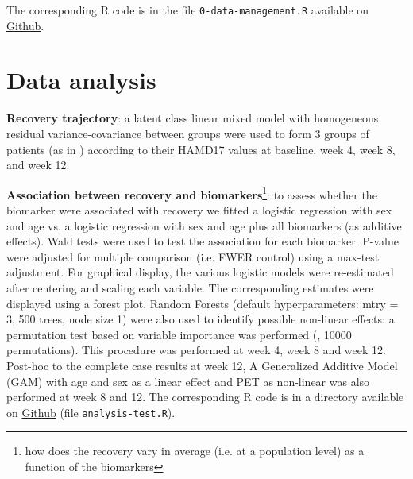 \documentclass[12pt]{article}
\begin{document}
\bigskip

The corresponding R code is in the file \texttt{0-data-management.R} available on \href{https://github.com/bozenne/article-predictionNP1BD3/blob/master/code-data-analysis/0-data-management.R}{Github}.

\section{Data analysis}
\label{sec:org75fab33}

\noindent \textbf{Recovery trajectory}: a latent class linear mixed model
with homogeneous residual variance-covariance between groups were used
to form 3 groups of patients (as in \cite{goerigk2021distinct})
according to their HAMD17 values at baseline, week 4, week 8, and
week 12.

\clearpage

\noindent \textbf{Association between recovery and biomarkers}\footnote{how does
the recovery vary in average (i.e. at a population level) as a
function of the biomarkers}: to assess whether the biomarker were
associated with recovery we fitted a logistic regression with sex and
age vs. a logistic regression with sex and age plus all biomarkers (as
additive effects). Wald tests were used to test the association for
each biomarker. P-value were adjusted for multiple comparison
(i.e. FWER control) using a max-test adjustment. For graphical
display, the various logistic models were re-estimated after centering
and scaling each variable. The corresponding estimates were displayed
using a forest plot. \newline Random Forests (default hyperparameters:
mtry = 3, 500 trees, node size 1) were also used to identify possible
non-linear effects: a permutation test based on variable importance
was performed (\cite{altmann2010permutation}, 10000
permutations). \newline This procedure was performed at week 4, week 8
and week 12. Post-hoc to the complete case results at week 12, A
Generalized Additive Model (GAM) with age and sex as a linear effect
and PET as non-linear was also performed at week 8 and 12. \newline
The corresponding R code is in a directory available on \href{https://github.com/bozenne/article-predictionNP1BD3/tree/master/code-data-analysis}{Github} (file
\texttt{analysis-test.R}).



\bigskip
\end{document}
